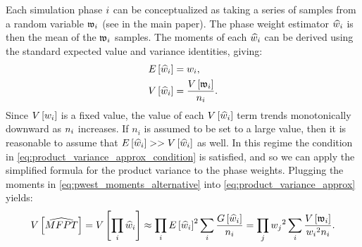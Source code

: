 Each  simulation phase $i$ can be conceptualized as taking a series of samples from a random variable $\mathfrak{w}_{i}$ (see  in the main paper). The phase weight estimator $\widehat{w}_{i}$ is then the mean of the $\mathfrak{w}_{i}$ samples. The moments of each $\widehat{w}_{i}$ can be derived using the standard expected value and variance identities\cite{Borovkov:2013hf}, giving:
    \begin{align}
    \label{eq:pwest_moments_alternative}
        \begin{split}
            E \left[ \widehat{w}_{i} \right] &= w_{i}, \\
            V \left[ \widehat{w}_{i} \right] &= \frac{V \left[ \mathfrak{w}_{i} \right]}{n_i}.
        \end{split}
    \end{align}
Since $V \left[ w_i \right]$ is a fixed value, the value of each $V \left[ \widehat{w}_{i} \right]$ term trends monotonically downward as $n_{i}$ increases. If $n_i$ is assumed to be set to a large value, then it is reasonable to assume that $E \left[ \widehat{w}_{i} \right] >> V \left[ \widehat{w}_{i} \right]$ as well. In this regime the condition in \eqref{eq:product_variance_approx_condition} is satisfied, and so we can apply the simplified formula for the product variance to the phase weights. Plugging the moments in \eqref{eq:pwest_moments_alternative} into \eqref{eq:product_variance_approx} yields:
    \begin{equation*}
        V \left[ \widehat{MFPT} \right] = V \left[ \prod_i \widehat{w}_{i} \right] \approx \prod_i E \left[ \widehat{w}_{i} \right]^2 \sum_i \frac{G \left[ \widehat{w}_{i} \right]}{n_i} = \prod_j w_{j} {}^2 \sum_i \frac{V \left[ \mathfrak{w}_{i} \right]}{w_{i} {}^2 n_i}.
    \end{equation*}
    

